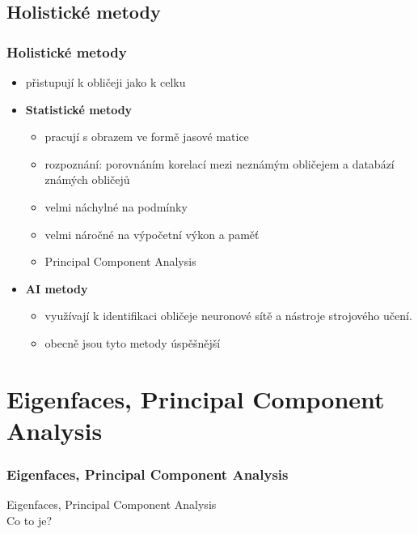 \documentclass{beamer}
\begin{document}
\subsection{Holistické metody}
\begin{frame}
\frametitle{Holistické metody}
\begin{itemize}
	\item přistupují k obličeji jako k celku
			\item \textbf{Statistické metody}
				\begin{itemize}
					\item pracují s obrazem ve formě jasové matice
					\item rozpoznání: porovnáním korelací mezi neznámým obličejem a databází známých obličejů
					\item velmi náchylné na podmínky
					\item velmi náročné na výpočetní výkon a paměť
					\item Principal Component Analysis
				\end{itemize}
			\item \textbf{AI metody}
				\begin{itemize}
					\item využívají k identifikaci obličeje neuronové sítě a nástroje strojového učení.
					\item obecně jsou tyto metody úspěšnější
				\end{itemize}
		\end{itemize}
\end{frame}

\section{Eigenfaces, Principal Component Analysis}
\begin{frame}
\begin{center}
\frametitle{Eigenfaces, Principal Component Analysis}
	\huge Eigenfaces, Principal Component Analysis\\[1.5cm]
	\large Co to je?
\end{center}
\end{frame}

\end{document}
